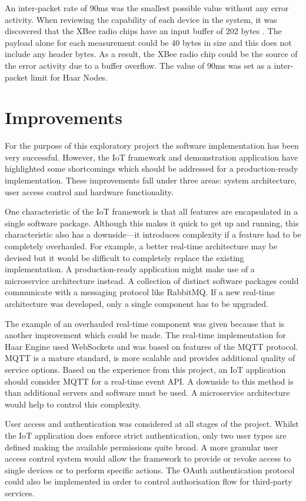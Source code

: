     An inter-packet rate of 90ms was the smallest possible value without any error activity. When reviewing the capability of each device in the system, it was discovered that the XBee radio chips have an input buffer of 202 bytes \citep{xbee-manual}. The payload alone for each measurement could be 40 bytes in size and this does not include any header bytes. As a result, the XBee radio chip could be the source of the error activity due to a buffer overflow. The value of 90ms was set as a inter-packet limit for Haar Nodes.

  \section{Improvements}
    For the purpose of this exploratory project the software implementation has been very successful. However, the IoT framework and demonstration application have highlighted some shortcomings which should be addressed for a production-ready implementation. These improvements fall under three areas: system architecture, user access control and hardware functionality.

    One characteristic of the IoT framework is that all features are encapsulated in a single software package. Although this makes it quick to get up and running, this characteristic also has a downside---it introduces complexity if a feature had to be completely overhauled. For example, a better real-time architecture may be devised but it would be difficult to completely replace the existing implementation. A production-ready application might make use of a microservice architecture instead. A collection of distinct software packages could communicate with a messaging protocol like RabbitMQ. If a new real-time architecture was developed, only a single component has to be upgraded.

    The example of an overhauled real-time component was given because that is another improvement which could be made. The real-time implementation for Haar Engine used WebSockets and was based on features of the MQTT protocol. MQTT is a mature standard, is more scalable and provides additional quality of service options. Based on the experience from this project, an IoT application should consider MQTT for a real-time event API. A downside to this method is than additional servers and software must be used. A microservice architecture would help to control this complexity.

    User access and authentication was considered at all stages of the project. Whilst the IoT application does enforce strict authentication, only two user types are defined making the available permissions quite broad. A more granular user access control system would allow the framework to provide or revoke access to single devices or to perform specific actions. The OAuth authentication protocol could also be implemented in order to control authorisation flow for third-party services.

